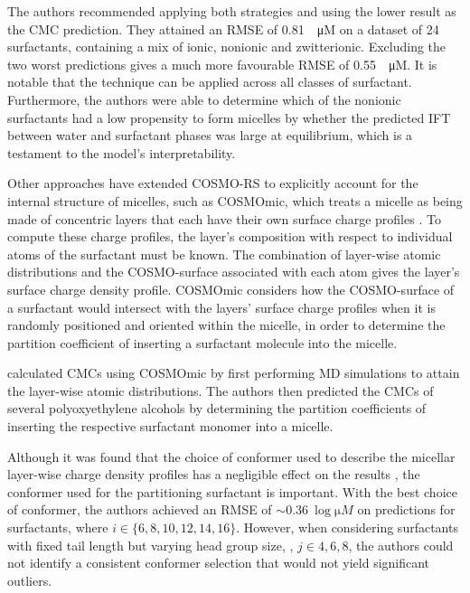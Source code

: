 The authors recommended applying both strategies and using the lower result as
the CMC prediction. They attained an RMSE of \SI{0.81}{\log \micro M} on a
dataset of 24 surfactants, containing a mix of ionic, nonionic and zwitterionic.
Excluding the two worst predictions gives a much more favourable RMSE of
\SI{0.55}{\log \micro M}. It is notable that the technique can be applied across
all classes of surfactant. Furthermore, the authors were able to determine which
of the nonionic surfactants had a low propensity to form micelles by whether the
predicted IFT between water and surfactant phases was large at equilibrium,
which is a testament to the model's interpretability.

Other approaches have extended COSMO-RS to explicitly account for the internal
structure of micelles, such as COSMOmic, which treats a micelle as being made of
concentric layers that each have their own surface charge profiles
\cite{klamtCOSMOmicMechanisticApproach2008}. To compute these charge profiles,
the layer's composition with respect to individual atoms of the surfactant must
be known. The combination of layer-wise atomic distributions and the
COSMO-surface associated with each atom gives the layer's surface charge density
profile. COSMOmic considers how the COSMO-surface of a surfactant would
intersect with the layers' surface charge profiles when it is randomly
positioned and oriented within the micelle, in order to determine the partition
coefficient of inserting a surfactant molecule into the micelle.

\citet{jakobtorweihenPredictingCriticalMicelle2017} calculated CMCs using
COSMOmic by first performing MD simulations to attain the layer-wise atomic
distributions. The authors then predicted the CMCs of several polyoxyethylene
alcohols by determining the partition coefficients of inserting the respective
surfactant monomer into a micelle.

Although it was found that the choice of conformer used to describe the micellar
layer-wise charge density profiles has a negligible effect on the results
\cite{jakobtorweihenCombinationCOSMOmicMolecular2013}, the conformer used for
the partitioning surfactant is important. With the best choice of conformer, the
authors achieved an RMSE of $\sim \SI{0.36}{\log \micro M}$ on predictions for
 surfactants, where $i \in \{6, 8, 10, 12, 14, 16\}$. However, when
considering surfactants with fixed tail length but varying head group size,
, $j \in {4, 6, 8}$, the authors could not identify a consistent
conformer selection that would not yield significant outliers.

